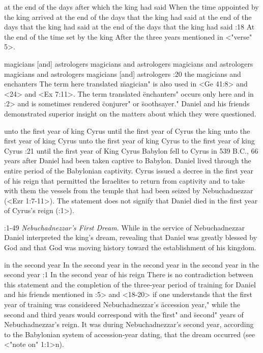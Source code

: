     {at the end of the days after which the king had said} %
    {When the time appointed by the king arrived} %
    {at the end of the days that the king had said} %
    {at the end of the days that the king had said} %
    {at the end of the days that the king had said} %
:18 {At the end of the time set by the king} After the three years mentioned in <"verse" 5>.



    {magicians [and] astrologers} %
    {magicians and astrologers} %
    {magicians and astrologers} %
    {magicians and astrologers} %
    {magicians [and] astrologers} %
:20 {the magicians and enchanters} The term here translated \"magician" is also used in
<Ge 41:8> and <24> and <Ex 7:11>. The term translated \"enchanters" occurs only here and in :2> and is
sometimes rendered \"conjurer" or \"soothsayer." Daniel and his friends demonstrated superior insight
on the matters about which they were questioned.

    {unto the first year of king Cyrus} %
    {until the first year of Cyrus the king} %
    {unto the first year of king Cyrus} %
    {unto the first year of king Cyrus} %
    {to the first year of king Cyrus} %
:21 {until the first year of King Cyrus} Babylon
fell to Cyrus in 539 B.C., 66 years after Daniel had been taken captive to Babylon. Daniel lived
through the entire period of the Babylonian captivity. Cyrus issued a decree in the first year of
his reign that permitted the Israelites to return from captivity and to take with them the vessels
from the temple that had been seized by Nebuchadnezzar (<Ezr 1:7-11>). The statement does not signify
that Daniel died in the first year of Cyrus's reign (:1>).

:1-49 {} {\it Nebuchadnezzar's First Dream.\/} While in the service of Nebuchadnezzar Daniel interpreted the
king's dream, revealing that Daniel was greatly blessed by God and that God was moving  
history toward the establishment of his kingdom.

    {in the second year} %
    {In the second year} %
    {in the second year} %
    {in the second year} %
    {in the second year} %
:1 {In the second year of his reign} There is no contradiction 
between this statement and the completion of the three-year period of training for Daniel and his
friends mentioned in :5> and  <18-20> if one understands that the first year of training was
considered Nebuchadnezzar's \"accession year," while the second and  
third years would correspond with the \"first" and \"second" years 
of Nebuchadnezzar's reign. It was during Nebuchadnezzar's second year, according to the Babylonian
system of accession-year  dating, that the dream occurred (see <"note on" 1:1>n).

